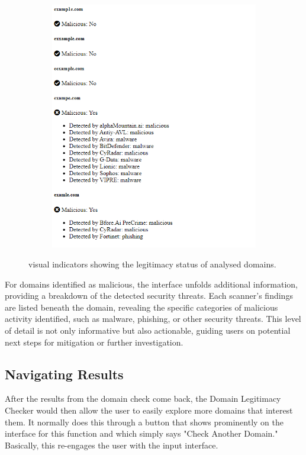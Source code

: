 \begin{figure}[H]
\begin{subfigure}[b]{0.45\textwidth}
    \includegraphics[width=\textwidth]{project/oooo.png}
    \label{fig:right}
  \end{subfigure}
  \caption{visual indicators showing the legitimacy status of analysed domains.}
  \label{fig:images}
\end{figure}

For domains identified as malicious, the interface unfolds additional information, providing a breakdown of the detected security threats. Each scanner's findings are listed beneath the domain, revealing the specific categories of malicious activity identified, such as malware, phishing, or other security threats. This level of detail is not only informative but also actionable, guiding users on potential next steps for mitigation or further investigation.

\subsection{Navigating Results}

After the results from the domain check come back, the Domain Legitimacy Checker would then allow the user to easily explore more domains that interest them. It normally does this through a button that shows prominently on the interface for this function and which simply says "Check Another Domain." Basically, this re-engages the user with the input interface.

